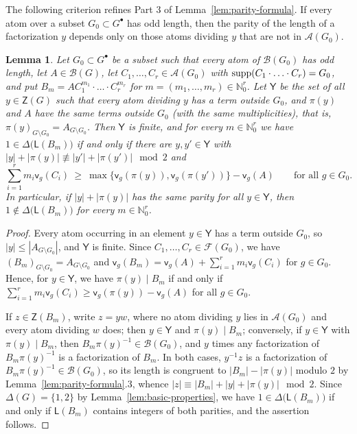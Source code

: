 \documentclass[a4paper, 10pt]{amsart}
\theoremstyle{plain}
\newtheorem{lemma}[theorem]{\bf Lemma}
\theoremstyle{definition}
\theoremstyle{definition}
\newcommand{\N}{\mathbb N}
\numberwithin{equation}{section}
\begin{document}
The following criterion refines Part 3 of Lemma~\ref{lem:parity-formula}. If every atom over a subset $G_0 \subset G^{\bullet}$ has odd
length, then the parity of the length of a factorization $y$ depends only on those
atoms dividing $y$ that are not in  $\mathcal A (G_0)$.

\begin{lemma} \label{lem:parity-criterion}
Let $G_0 \subset G^{\bullet}$ be a subset such that every atom of $\mathcal B (G_0)$ has
odd length, let $A \in \mathcal B (G)$, let
$C_1, \ldots, C_r \in \mathcal A (G_0)$ with
$\operatorname{supp} (C_1 \cdot \ldots \cdot C_r) = G_0$, and put
$B_m = A C_1^{m_1} \cdot \ldots \cdot C_r^{m_r}$ for
$m = (m_1, \ldots, m_r) \in \N_0^r$.  Let $\mathsf Y$ be the set of all
$y \in \mathsf Z (G)$ such that every atom dividing $y$ has a term outside $G_0$,
and $\pi(y)$ and $A$ have the same terms outside $G_0$ (with the same
multiplicities), that is, $\pi(y)_{G\setminus G_0} = A_{G\setminus G_0}$.
Then $\mathsf Y$ is finite, and
for every $m \in \N_0^r$ we have $1 \in \Delta \big(\mathsf L (B_m)\big)$ if and
only if there are $y, y' \in \mathsf Y$ with
$|y| + |\pi(y)| \not\equiv |y'| + |\pi(y')| \mod 2$ and
\begin{equation}
 \sum_{i=1}^{r} m_i \mathsf v_g (C_i)
 \ \ge\ \max \{ \mathsf v_g (\pi(y)), \mathsf v_g (\pi(y')) \} - \mathsf v_g (A)
\qquad \text{for all } g \in G_0 .\label{eq:cone-feasibility}
\end{equation}
In particular, if $|y| + |\pi(y)|$ has the same parity for all
$y \in \mathsf Y$, then $1 \notin \Delta \big(\mathsf L (B_m)\big)$ for every
$m \in \N_0^r$.
\end{lemma}

\begin{proof}
Every atom occurring in an element $y \in \mathsf Y$ has a term outside $G_0$, so
$|y| \le |A_{G \setminus G_0}|$, and $\mathsf Y$ is finite.  Since
$C_1, \ldots, C_r \in \mathcal F (G_0)$, we have
$(B_m)_{G \setminus G_0} = A_{G \setminus G_0}$ and
$\mathsf v_g (B_m) = \mathsf v_g (A) + \sum_{i=1}^r m_i \mathsf v_g (C_i)$ for
$g \in G_0$.  Hence, for $y \in \mathsf Y$, we have $\pi(y) \mid B_m$ if and only
if $\sum_{i=1}^r m_i \mathsf v_g (C_i) \ge \mathsf v_g (\pi(y)) - \mathsf v_g (A)$
for all $g \in G_0$.

If $z \in \mathsf Z (B_m)$, write $z = yw$, where no atom dividing $y$ lies
in $\mathcal A (G_0)$ and every atom dividing $w$ does; then $y \in \mathsf Y$
and $\pi(y) \mid B_m$;
conversely, if $y \in \mathsf Y$ with $\pi(y) \mid B_m$, then
$B_m\pi(y)^{-1} \in \mathcal B (G_0)$, and $y$ times any factorization of
$B_m\pi(y)^{-1}$ is a factorization of $B_m$.  In both cases, $y^{-1}z$ is a
factorization of $B_m\pi(y)^{-1} \in \mathcal B (G_0)$, so its length is
congruent to $|B_m| - |\pi(y)|$ modulo $2$ by 
Lemma~\ref{lem:parity-formula}.3, whence
$|z| \equiv |B_m| + |y| + |\pi(y)| \mod 2$.  Since $\Delta (G) = \{1,2\}$ by
Lemma~\ref{lem:basic-properties}, we have $1 \in \Delta \big(\mathsf L (B_m)\big)$
if and only if $\mathsf L (B_m)$ contains integers of both parities, and the
assertion follows.
\end{proof}
\end{document}
